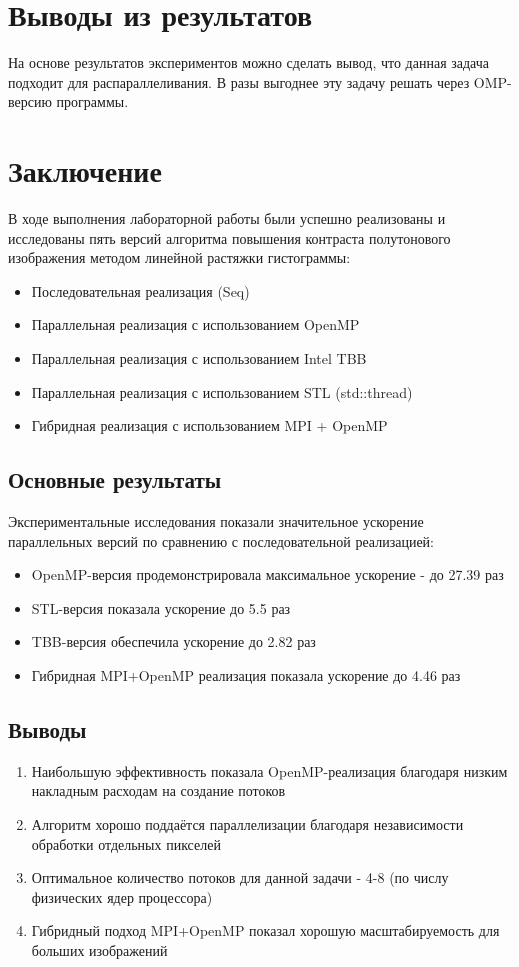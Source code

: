 \documentclass[a4paper,12pt]{article}
\begin{document}
\section{Выводы из результатов}
На основе результатов экспериментов можно сделать вывод, что данная задача подходит для распараллеливания. В разы выгоднее эту задачу решать через OMP-версию программы.
\newpage
\section{Заключение}
В ходе выполнения лабораторной работы были успешно реализованы и исследованы пять версий алгоритма повышения контраста полутонового изображения методом линейной растяжки гистограммы:

\begin{itemize}
    \item Последовательная реализация (Seq)
    \item Параллельная реализация с использованием OpenMP
    \item Параллельная реализация с использованием Intel TBB
    \item Параллельная реализация с использованием STL (std::thread)
    \item Гибридная реализация с использованием MPI + OpenMP
\end{itemize}

\subsection{Основные результаты}
Экспериментальные исследования показали значительное ускорение параллельных версий по сравнению с последовательной реализацией:

\begin{itemize}
    \item OpenMP-версия продемонстрировала максимальное ускорение - до 27.39 раз
    \item STL-версия показала ускорение до 5.5 раз
    \item TBB-версия обеспечила ускорение до 2.82 раз
    \item Гибридная MPI+OpenMP реализация показала ускорение до 4.46 раз
\end{itemize}

\subsection{Выводы}
\begin{enumerate}
    \item Наибольшую эффективность показала OpenMP-реализация благодаря низким накладным расходам на создание потоков
    \item Алгоритм хорошо поддаётся параллелизации благодаря независимости обработки отдельных пикселей
    \item Оптимальное количество потоков для данной задачи - 4-8 (по числу физических ядер процессора)
    \item Гибридный подход MPI+OpenMP показал хорошую масштабируемость для больших изображений
\end{enumerate}
\end{document}
